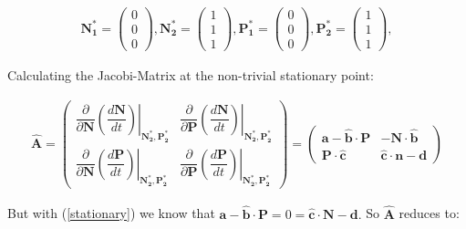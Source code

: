 \documentclass{article}
\begin{document}
\begin{align}
    \mathbf{N_1^{*}} = \left( \begin{matrix} 0 \\ 0 \\ 0 \end{matrix} \right),
    \mathbf{N_2^{*}} = \left( \begin{matrix} 1 \\ 1 \\ 1 \end{matrix} \right),
    \mathbf{P_1^{*}} = \left( \begin{matrix} 0 \\ 0 \\ 0 \end{matrix} \right),
    \mathbf{P_2^{*}} = \left( \begin{matrix} 1 \\ 1 \\ 1 \end{matrix} \right),
    \label{stationary}
\end{align}

Calculating the Jacobi-Matrix at the non-trivial stationary point:

\begin{align}
    \mathbf{\hat A} =
    \left(
	\begin{matrix}
	    \left. \dfrac{\partial}{\partial \mathbf{N}} \left(
	    \dfrac{d \mathbf{N}}{dt} \right) \right| 
	    _{\mathbf{N^*_2}, \mathbf{P^*_2}}
	    & \left. \dfrac{\partial}{\partial \mathbf{P}} \left( 
	    \dfrac{d \mathbf{N}}{dt} \right) \right| 
	    _{\mathbf{N^*_2}, \mathbf{P^*_2}} \\[2ex]
	    \left. \dfrac{\partial}{\partial \mathbf{N}} \left(
	    \dfrac{d \mathbf{P}}{dt} \right) \right|
	    _{\mathbf{N^*_2}, \mathbf{P^*_2}}
	    & \left. \dfrac{\partial}{\partial \mathbf{P}} \left(
	    \dfrac{d \mathbf{P}}{dt} \right) \right|
	    _{\mathbf{N^*_2}, \mathbf{P^*_2}}
	\end{matrix}
    \right) = 
    \left(
	\begin{matrix}
	    \mathbf{a - \hat b \cdot P} & \mathbf{-N \cdot \hat b} \\ 
	    \mathbf{P \cdot \hat c} & \mathbf{\hat c \cdot n - d} 
	\end{matrix}
    \right)
\end{align}

But with (\ref{stationary}) we know that \( \mathbf{a - \hat b \cdot P} =
    0
= \mathbf{\hat c \cdot N - d} .
\) 
So \( \mathbf{\hat A} \) reduces to:
\end{document}
